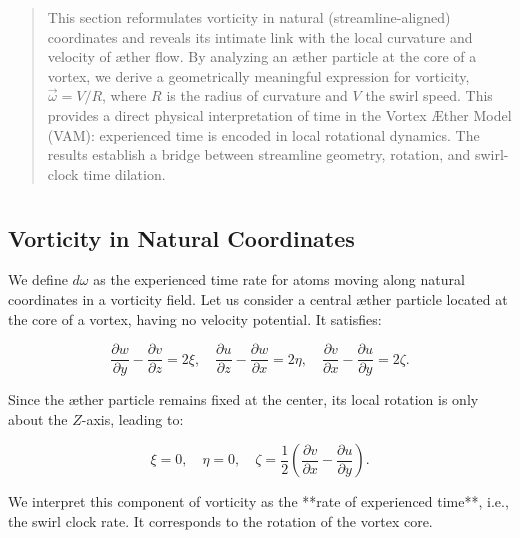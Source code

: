 \documentclass[12pt]{article}
\begin{document}
    \titlepageOpen

    \begin{abstract}
        This section reformulates vorticity in natural (streamline-aligned) coordinates and reveals its intimate link with the local curvature and velocity of æther flow. By analyzing an æther particle at the core of a vortex, we derive a geometrically meaningful expression for vorticity, \(\vec{\omega} = V / R\), where \(R\) is the radius of curvature and \(V\) the swirl speed. This provides a direct physical interpretation of time in the Vortex Æther Model (VAM): experienced time is encoded in local rotational dynamics. The results establish a bridge between streamline geometry, rotation, and swirl-clock time dilation.
    \end{abstract}


    \titlepageClose
    \fi

    \section{\appendixtitle}
    \subsection{Vorticity in Natural Coordinates}

    We define \( d\omega \) as the experienced time rate for atoms moving along natural coordinates in a vorticity field. Let us consider a central æther particle located at the core of a vortex, having no velocity potential. It satisfies:

    \begin{equation}
        \frac{\partial w}{\partial y} - \frac{\partial v}{\partial z} = 2\xi, \quad
        \frac{\partial u}{\partial z} - \frac{\partial w}{\partial x} = 2\eta, \quad
        \frac{\partial v}{\partial x} - \frac{\partial u}{\partial y} = 2\zeta.
    \end{equation}

    Since the æther particle remains fixed at the center, its local rotation is only about the \(Z\)-axis, leading to:

    \begin{equation}
        \xi = 0, \quad \eta = 0, \quad \zeta = \frac{1}{2} \left( \frac{\partial v}{\partial x} - \frac{\partial u}{\partial y} \right).
    \end{equation}

    We interpret this component of vorticity as the **rate of experienced time**, i.e., the swirl clock rate. It corresponds to the rotation of the vortex core.
\end{document}
